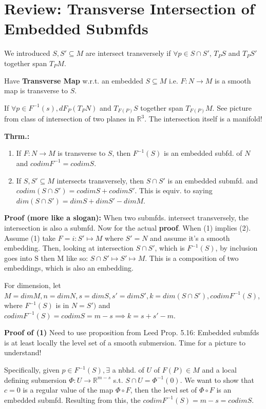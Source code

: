 \documentclass[12pt,letterpaper]{article}
\begin{document}
\section*{Review: Transverse Intersection of Embedded Submfds}

We introduced $S, S' \subseteq M$ are intersect transversely if $\forall p \in S \cap S'$,  $T_P S$ and $T_P S'$ together span $T_P M$. 

Have \textbf{Transverse Map} w.r.t. an embedded $S \subseteq M$ i.e. $F: N \rightarrow M$ is a smooth map is transverse to $S$. 

If $\forall p \in F^{-1}(s), dF_P (T_P N)$ and $T_{F(P)} S$ together span $T_{F(P)} M$. See picture from class of intersection of two planes in $\mathbb{R}^3$. The intersection itself is a manifold!

\textbf{Thrm.:} 
\begin{enumerate}
    \item If $F:  N \rightarrow M$ is transverse to $S$, then $F^{-1}(S)$ is an embedded subfd. of $N$ and $codimF^{-1} = codimS$.
    \item If $S, S' \subseteq M$ intersects transversely, then $S \cap S'$ is an embedded submfd. and $codim(S\cap S') = codimS + codimS'$. This is equiv. to saying $dim(S \cap S') = dimS + dimS' - dimM$.
\end{enumerate}

\textbf{Proof (more like a slogan):} When two submfds. intersect transversely, the intersection is also a submfd. Now for the actual \textbf{proof}. When (1) implies (2). Assume (1) take $F = i: S' \mapsto M$ where $S' = N$ and assume it's a smooth embedding. Then, looking at intersection $S \cap S'$, which is $F^{-1}(S)$, by inclusion goes into S then M like so: $S \cap S' \mapsto S' \mapsto M$. This is a composition of two embeddings, which is also an embedding. 

For dimension, let $M= dimM, n=dimN, s=dimS, s'=dimS', k=dim( S \cap S'), codimF^{-1}(S)$, where $F^{-1}(S)$ is in $N=S')$ and  $codimF^{-1}(S) = codimS = m-s \implies k = s + s' - m$.

\textbf{Proof of (1)} Need to use proposition from Leed Prop. 5.16: Embedded submfds is at least locally the level set of a smooth submersion. Time for a picture to understand!

Specifically, given $p \in F^{-1}(S), \exists $ a nbhd. of $U$ of $F(P) \in M$ and a local defining submersion $\Phi: U \rightarrow \mathbb{R}^{m-s}$ s.t. $S \cap U = \Phi^{-1}(0)$. We want to show that $c=0$ is a regular value of the map $\Phi \circ F$, then the level set of $\Phi \circ F$ is an embedded submfd. Resulting from this, the $codimF^{-1}(S) = m - s = codimS$. 
\end{document}
